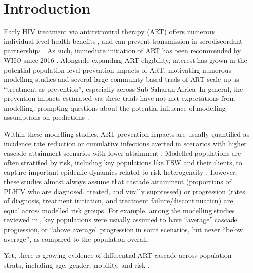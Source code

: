 \section{Introduction}\label{art.intro} %
Early HIV treatment via antiretroviral therapy (ART) offers
numerous individual-level health benefits \cite{Gabillard2013,Maartens2014,Danel2015,Lundgren2015init},
and can prevent transmission in serodiscordant partnerships \cite{Anglemyer2013,Cohen2016,Rodger2019}.
As such, immediate initiation of ART has been recommended by WHO since 2016 \cite{WHO2016art}.
Alongside expanding ART eligibility,
interest has grown in the potential population-level prevention impacts of ART, motivating
numerous modelling studies \cite{Granich2009,Eaton2012,Eaton2014art,Knight2022sr} and
several large community-based trials \cite{Makhema2019,Havlir2019,Hayes2019,Iwuji2018}
of ART scale-up as ``treatment as prevention'', especially across Sub-Saharan Africa.
In general, the prevention impacts estimated via these trials
have not met expectations from modelling, prompting questions about
the potential influence of modelling assumptions on predictions \cite{Baral2019}.
\par
Within these modelling studies, ART prevention impacts are usually quantified as
incidence rate reduction or cumulative infections averted
in scenarios with higher cascade attainment \vs scenarios with lower attainment \cite{Knight2022sr}.
Modelled populations are often stratified by risk,
including key populations like FSW and their clients,
to capture important epidemic dynamics related to risk heterogeneity
\cite{Stigum1994,Garnett1996,Watts2010}.
However, these studies almost always assume that cascade
attainment (\ie proportions of PLHIV who are diagnosed, treated, and virally suppressed) or
progression (\ie rates of diagnosis, treatment initiation, and treatment failure/discontinuation)
are equal across modelled risk groups.
For example, among the modelling studies reviewed in \cite{Knight2022sr},
key populations were usually assumed to have ``average'' cascade progression,
or ``above average'' progression in some scenarios, but never ``below average'',
as compared to the population overall.
\par
Yet, there is growing evidence of differential ART cascade across population strata,  %
including age, gender, mobility, and risk \cite{Hakim2018,Green2020}. %
